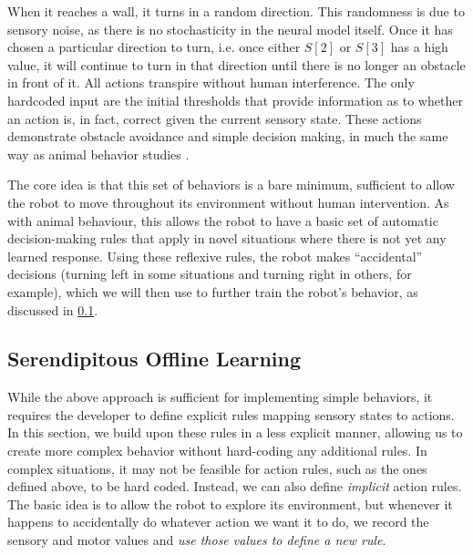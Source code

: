 \documentclass[conference]{IEEEtran}
\begin{document}
When it reaches a wall, it turns in a random direction. This randomness is due 
to sensory noise, as there is no stochasticity in the neural model 
itself. Once it has chosen a particular direction to turn, i.e. once 
either $S[2]$ or $S[3]$ has a high value, it will continue to turn in that 
direction until there is no longer an obstacle in front of it. All actions 
transpire without human interference. The only hardcoded input are the initial 
thresholds that provide information as to whether an action is, in fact, 
correct given the current sensory state. These actions demonstrate obstacle 
avoidance and simple decision making, in much the same way as animal behavior 
studies \cite{kim2007encoding}. 

The core idea is that this set of behaviors is a bare minimum, sufficient to
allow the robot to move throughout its environment without human intervention.
As with animal behaviour, this allows the robot to have a basic set of automatic
decision-making rules that apply in novel situations where there is not yet
any learned response.  Using these reflexive rules, the robot makes ``accidental''
decisions (turning left in some situations and turning right in others, for
example), which we will then use to further train the robot's behavior, as
discussed in \ref{learning}.


\subsection{Serendipitous Offline Learning} \label{learning}

While the above approach is sufficient for implementing simple behaviors, it requires the developer to define explicit rules mapping sensory states to actions. In this section, we build upon these
rules in a less explicit manner, allowing us to create more complex behavior
without hard-coding any additional rules.  In complex situations, it may not be 
feasible for action rules, such as the ones defined above, to be hard coded. Instead,
we can also define \textit{implicit} action rules. The basic idea is to allow
the robot to explore its environment, but whenever it happens to accidentally
do whatever action we want it to do, we record the sensory and motor 
values and \textit{use those values to define a new rule}.
\end{document}
